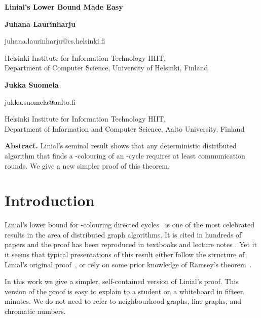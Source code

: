 \documentclass[11pt,a4paper]{article}
\begin{document}
\begin{flushleft}
{\Large\bfseries Linial's Lower Bound Made Easy\par}

\bigskip
\textbf{Juhana Laurinharju}

{\sffamily\small juhana.laurinharju@cs.helsinki.fi}

{\footnotesize
Helsinki Institute for Information Technology HIIT, \\
Department of Computer Science, University of Helsinki, Finland\par}

\medskip
\textbf{Jukka Suomela}

{\sffamily\small jukka.suomela@aalto.fi}

{\footnotesize
Helsinki Institute for Information Technology HIIT, \\
Department of Information and Computer Science, Aalto University, Finland\par}
\end{flushleft}

\bigskip
\bigskip
\noindent\textbf{Abstract.}
Linial's seminal result shows that any deterministic distributed algorithm that finds a -colouring of an -cycle requires at least  communication rounds. We give a new simpler proof of this theorem.

\medskip


\section{Introduction}

Linial's lower bound for -colouring directed cycles~\cite{linial92locality} is one of the most celebrated results in the area of distributed graph algorithms. It is cited in hundreds of papers and the proof has been reproduced in textbooks and lecture notes \cite{peleg00distributed,barenboim13distributed,wattenhofer13lecture,suomela-ddabook}. Yet it it seems that typical presentations of this result either follow the structure of Linial's original proof~\cite{peleg00distributed,barenboim13distributed,wattenhofer13lecture}, or rely on some prior knowledge of Ramsey's theorem~\cite{suomela-ddabook}.

In this work we give a simpler, self-contained version of Linial's proof. This version of the proof is easy to explain to a student on a whiteboard in fifteen minutes. We do not need to refer to neighbourhood graphs, line graphs, and chromatic numbers.
\end{document}
